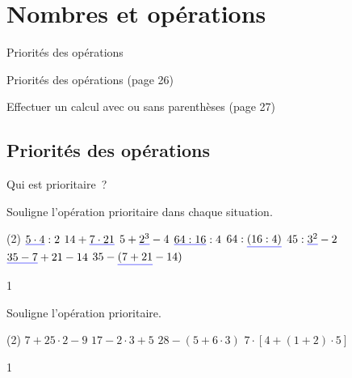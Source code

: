 \documentclass[a4paper,11pt]{report}
\begin{document}
\newcommand{\chapterName}{Nombres et opérations}
\newcommand{\serieName}{Priorités des opérations}


\chapter*{\chapterName}
\thispagestyle{empty}

\begin{amL}{\serieName}{
\item Priorités des opérations (page 26)
\item Effectuer un calcul avec ou sans parenthèses (page 27)
}
\end{amL}
\section*{\serieName}
\setcounter{page}{1}
\thispagestyle{firstPage}





\begin{resolu}{Qui est prioritaire~?}{Souligne l'opération prioritaire dans chaque situation.
\begin{tasks}(2)
    \task ${\color{blue}\uline{{\color{black}5\cdot 4}}} \div  2$
    \task $14+{\color{blue}\uline{{\color{black}7\cdot 21}}}$
    \task $5+{\color{blue}\uline{{\color{black}2^3}}}-4$
    \task ${\color{blue}\uline{{\color{black}64 \div  16}}} \div  4 $
    \task $64 \div  {\color{blue}\uline{{\color{black}(16 \div  4)}}}$
    \task $45\div {\color{blue}\uline{{\color{black}3^2}}}-2$
    \task ${\color{blue}\uline{{\color{black}35-7}}}+21-14$
    \task $35-{\color{blue}\uline{{\color{black}(7+21}}}-14)$
\end{tasks}}{1}
\end{resolu}

\begin{exop}{
Souligne l'opération prioritaire.
\begin{tasks}(2)
\task $7+25\cdot 2-9$
\task $17-2\cdot3+5$
\task $28-(5+6\cdot3)$
\task $7\cdot\left[4+(1+2)\cdot 5\right]$
\end{tasks}
}{1}\end{exop}
\end{document}
